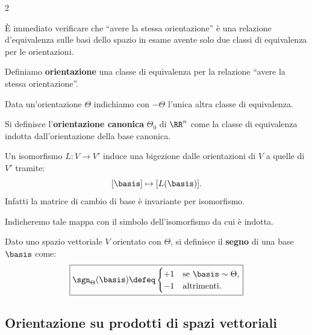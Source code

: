 \begin{multicols*}{2}
    \begin{remark}
        È immediato verificare che ``avere la stessa orientazione'' è
        una relazione d'equivalenza sulle basi dello spazio in esame
        avente solo due classi di equivalenza
        per le orientazioni.
    \end{remark}

    \begin{definition}[Orientazione]
        Definiamo \textbf{orientazione} una classe di equivalenza per la relazione
        ``avere la stessa orientazione''. \smallskip

        Data un'orientazione $\Theta$ indichiamo con $-\Theta$ l'unica altra
        classe di equivalenza.
    \end{definition}

    \begin{definition}
        Si definisce l'\textbf{orientazione canonica} $\Theta_0$ di $\RR^n$
        come la classe di equivalenza indotta dall'orientazione della base
        canonica. \smallskip
    \end{definition}

    \begin{remark}
        Un isomorfismo $L : V \to V'$ induce una bigezione dalle orientazioni
        di $V$ a quelle di $V'$ tramite:
        \[
            [\basis] \mapsto [L(\basis)].
        \]
        Infatti la matrice di cambio di base è invariante per isomorfismo. \smallskip

        Indicheremo tale mappa con il simbolo dell'isomorfismo da cui è indotta.
    \end{remark}

    \begin{definition}
        Dato uno spazio vettoriale $V$ orientato con $\Theta$, si definisce
        il \textbf{segno} di una base $\basis$ come:
        \[
            \boxed{\sgn_\Theta(\basis) \defeq \begin{cases}
                    +1 & \text{se } \basis \sim \Theta, \\
                    -1 & \text{altrimenti}.
                \end{cases}}
        \]
    \end{definition}

    \subsection{Orientazione su prodotti di spazi vettoriali}


\end{multicols*}
